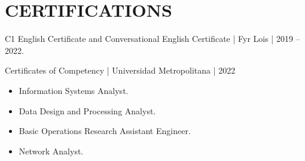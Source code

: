 \documentclass[10pt,a4paper]{article}
\begin{document}
\section*{CERTIFICATIONS}
C1 English Certificate and Conversational English Certificate | Fyr Lois | 2019 -- 2022.

Certificates of Competency | Universidad Metropolitana | 2022
\begin{itemize}
    \item Information Systems Analyst.
    \item Data Design and Processing Analyst.
    \item Basic Operations Research Assistant Engineer.
    \item Network Analyst.
\end{itemize}
\end{document}
